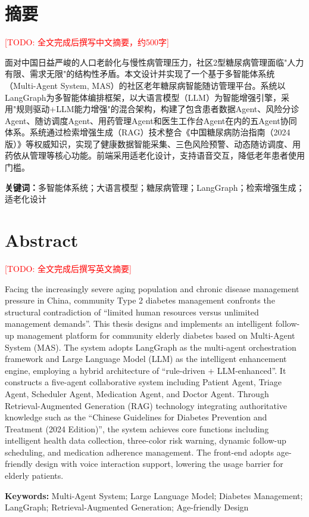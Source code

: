 
\chapter*{摘\quad 要}

\textcolor{red}{[TODO: 全文完成后撰写中文摘要，约500字]}

面对中国日益严峻的人口老龄化与慢性病管理压力，社区2型糖尿病管理面临"人力有限、需求无限"的结构性矛盾。本文设计并实现了一个基于多智能体系统（Multi-Agent System, MAS）的社区老年糖尿病智能随访管理平台。系统以LangGraph为多智能体编排框架，以大语言模型（LLM）为智能增强引擎，采用"规则驱动+LLM能力增强"的混合架构，构建了包含患者数据Agent、风险分诊Agent、随访调度Agent、用药管理Agent和医生工作台Agent在内的五Agent协同体系。系统通过检索增强生成（RAG）技术整合《中国糖尿病防治指南（2024版）》等权威知识，实现了健康数据智能采集、三色风险预警、动态随访调度、用药依从管理等核心功能。前端采用适老化设计，支持语音交互，降低老年患者使用门槛。

\vspace{1em}
\noindent\textbf{关键词：}多智能体系统；大语言模型；糖尿病管理；LangGraph；检索增强生成；适老化设计

\newpage

\chapter*{Abstract}

\textcolor{red}{[TODO: 全文完成后撰写英文摘要]}

Facing the increasingly severe aging population and chronic disease management pressure in China, community Type 2 diabetes management confronts the structural contradiction of ``limited human resources versus unlimited management demands''. This thesis designs and implements an intelligent follow-up management platform for community elderly diabetes based on Multi-Agent System (MAS). The system adopts LangGraph as the multi-agent orchestration framework and Large Language Model (LLM) as the intelligent enhancement engine, employing a hybrid architecture of ``rule-driven + LLM-enhanced''. It constructs a five-agent collaborative system including Patient Agent, Triage Agent, Scheduler Agent, Medication Agent, and Doctor Agent. Through Retrieval-Augmented Generation (RAG) technology integrating authoritative knowledge such as the ``Chinese Guidelines for Diabetes Prevention and Treatment (2024 Edition)'', the system achieves core functions including intelligent health data collection, three-color risk warning, dynamic follow-up scheduling, and medication adherence management. The front-end adopts age-friendly design with voice interaction support, lowering the usage barrier for elderly patients.

\vspace{1em}
\noindent\textbf{Keywords:} Multi-Agent System; Large Language Model; Diabetes Management; LangGraph; Retrieval-Augmented Generation; Age-friendly Design
